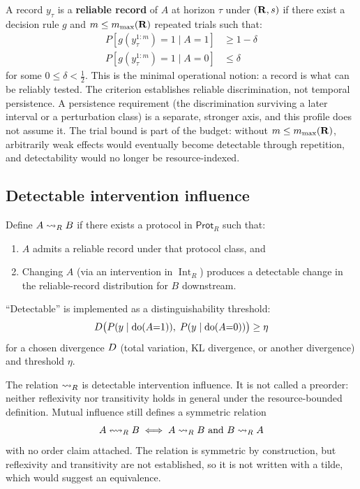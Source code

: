 A record $y_\tau$ is a \textbf{reliable record} of $A$ at horizon $\tau$
under $(\mathbf{R}, s)$ if there exist a decision rule $g$ and
$m \le m_{\max}(\mathbf{R})$ repeated trials such that:
\begin{align}
  P[g(y_\tau^{1:m}) = 1 \mid A = 1] &\geq 1 - \delta
  \label{eq:reliable-record-power} \\
  P[g(y_\tau^{1:m}) = 1 \mid A = 0] &\leq \delta\label{eq:reliable-record-size}
\end{align}
for some $0\le\delta < \frac{1}{2}$.  This is the minimal operational
notion: a record is what can be reliably tested.  The criterion
establishes reliable discrimination, not temporal persistence.  A persistence requirement (the discrimination
surviving a later interval or a perturbation class) is a separate,
stronger axis, and this profile does not assume it.  The trial bound is
part of the budget: without $m \le m_{\max}(\mathbf{R})$, arbitrarily
weak effects would eventually become detectable through repetition, and
detectability would no longer be resource-indexed.

\subsection{Detectable intervention influence}\label{sec:detectable-influence-def}

Define $A \rightsquigarrow_{R} B$ if there exists a protocol in
$\mathsf{Prot}_R$ such that:
\begin{enumerate}
  \item $A$ admits a reliable record under that protocol class, and
  \item Changing $A$ (via an intervention in $\operatorname{Int}_R$)
        produces a detectable change in the reliable-record
        distribution for $B$ downstream.
\end{enumerate}

``Detectable'' is implemented as a distinguishability threshold:
\begin{equation}
  D\bigl(
    P(y \mid \mathrm{do}(A{=}1)),\;
    P(y \mid \mathrm{do}(A{=}0))
  \bigr) \geq \eta\label{eq:causal-detectability}
\end{equation}
for a chosen divergence $D$ (total variation, KL
divergence, or another divergence) and threshold $\eta$.

The relation $\rightsquigarrow_{R}$ is detectable intervention influence.
It is not called a preorder: neither reflexivity nor
transitivity holds in general under the resource-bounded definition.
Mutual influence still defines a symmetric relation
\begin{equation}
  A \leftrightsquigarrow_{R} B \iff A \rightsquigarrow_{R} B
  \text{ and } B \rightsquigarrow_{R} A\label{eq:mutual-influence}
\end{equation}
with no order claim attached.  The relation is symmetric by
construction, but reflexivity and transitivity are not established,
so it is not written with a tilde, which would suggest an
equivalence.

